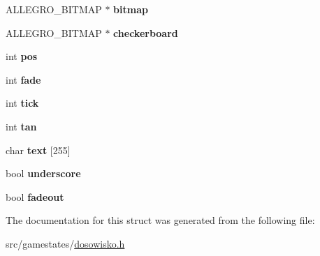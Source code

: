 \begin{DoxyCompactItemize}
\item 
\hypertarget{structdosowiskoResources_aa706a855226a87c5d0c41046a11801d9}{A\+L\+L\+E\+G\+R\+O\+\_\+\+B\+I\+T\+M\+A\+P $\ast$ {\bfseries bitmap}}\label{structdosowiskoResources_aa706a855226a87c5d0c41046a11801d9}

\item 
\hypertarget{structdosowiskoResources_ac62e131d7846aa5d3bf0919654fec301}{A\+L\+L\+E\+G\+R\+O\+\_\+\+B\+I\+T\+M\+A\+P $\ast$ {\bfseries checkerboard}}\label{structdosowiskoResources_ac62e131d7846aa5d3bf0919654fec301}

\item 
\hypertarget{structdosowiskoResources_a48bc1b2edc69bbcb7bec32dbf5d0ad8c}{int {\bfseries pos}}\label{structdosowiskoResources_a48bc1b2edc69bbcb7bec32dbf5d0ad8c}

\item 
\hypertarget{structdosowiskoResources_a64b6c6fd0a9cf43c7a54a90d95c4ae84}{int {\bfseries fade}}\label{structdosowiskoResources_a64b6c6fd0a9cf43c7a54a90d95c4ae84}

\item 
\hypertarget{structdosowiskoResources_ad3fa8c9d3f2fc74ce02ca6eafdd14423}{int {\bfseries tick}}\label{structdosowiskoResources_ad3fa8c9d3f2fc74ce02ca6eafdd14423}

\item 
\hypertarget{structdosowiskoResources_ad24e2b97a0b35074b24d57a8d1c41210}{int {\bfseries tan}}\label{structdosowiskoResources_ad24e2b97a0b35074b24d57a8d1c41210}

\item 
\hypertarget{structdosowiskoResources_a11b5c9e59a9a69d6c73b536aa6f7b02c}{char {\bfseries text} \mbox{[}255\mbox{]}}\label{structdosowiskoResources_a11b5c9e59a9a69d6c73b536aa6f7b02c}

\item 
\hypertarget{structdosowiskoResources_aabcd05e4d59a4645441247eae062d3c4}{bool {\bfseries underscore}}\label{structdosowiskoResources_aabcd05e4d59a4645441247eae062d3c4}

\item 
\hypertarget{structdosowiskoResources_a9771de3d79a09aecf4daecea22a1bdfa}{bool {\bfseries fadeout}}\label{structdosowiskoResources_a9771de3d79a09aecf4daecea22a1bdfa}

\end{DoxyCompactItemize}


The documentation for this struct was generated from the following file\+:\begin{DoxyCompactItemize}
\item 
src/gamestates/\hyperlink{dosowisko_8h}{dosowisko.\+h}\end{DoxyCompactItemize}
